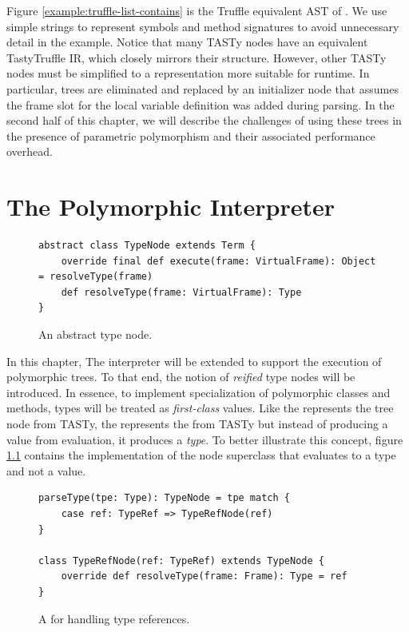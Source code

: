 Figure \ref{example:truffle-list-contains} is the Truffle equivalent AST of .
We use simple strings to represent symbols and method signatures to avoid unnecessary detail in the example.
Notice that many TASTy nodes have an equivalent TastyTruffle IR, which closely mirrors their structure.
However, other TASTy nodes must be simplified to a representation more suitable for runtime.
In particular,  trees are eliminated and replaced by an initializer node that assumes the frame slot for the local variable definition was added during parsing.
In the second half of this chapter, we will describe the challenges of using these trees in the presence of parametric polymorphism and their associated performance overhead.

\chapter{The Polymorphic Interpreter}
\label{implementation:specialization}

\begin{figure}[!htb]
\begin{verbatim}
abstract class TypeNode extends Term {
	override final def execute(frame: VirtualFrame): Object = resolveType(frame)
	def resolveType(frame: VirtualFrame): Type 
}
\end{verbatim}
\caption{An abstract type node.}
\label{impl:type-node}
\end{figure}

In this chapter, The interpreter will be extended to support the execution of polymorphic trees.
To that end, the notion of \textit{reified} type nodes will be introduced.
In essence, to implement specialization of polymorphic classes and methods, types will be treated as \textit{first-class} values.
Like the  represents the  tree node from TASTy, the  represents the  from TASTy but instead of producing a value from evaluation, it produces a \textit{type}.
To better illustrate this concept, figure \ref{impl:type-node} contains the implementation of the node superclass that evaluates to a type and not a value.

\begin{figure}[!htb]
\begin{verbatim}
parseType(tpe: Type): TypeNode = tpe match {
	case ref: TypeRef => TypeRefNode(ref)
}

class TypeRefNode(ref: TypeRef) extends TypeNode {
	override def resolveType(frame: Frame): Type = ref
}
\end{verbatim}
\caption{A  for handling type references.}
\label{impl:parse-type}
\end{figure}

